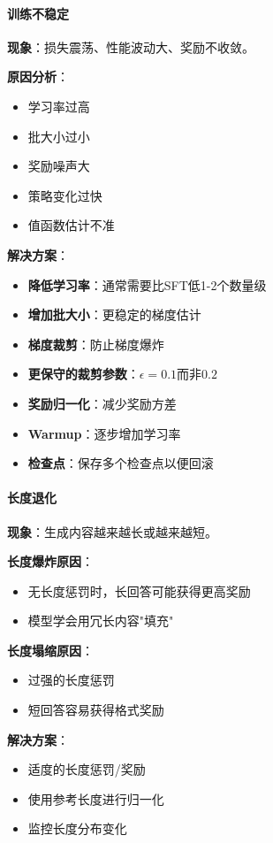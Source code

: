\documentclass[12pt,a4paper]{article}
\begin{document}
\paragraph{训练不稳定}

\textbf{现象}：损失震荡、性能波动大、奖励不收敛。

\textbf{原因分析}：
\begin{itemize}
    \item 学习率过高
    \item 批大小过小
    \item 奖励噪声大
    \item 策略变化过快
    \item 值函数估计不准
\end{itemize}

\textbf{解决方案}：
\begin{itemize}
    \item \textbf{降低学习率}：通常需要比SFT低1-2个数量级
    \item \textbf{增加批大小}：更稳定的梯度估计
    \item \textbf{梯度裁剪}：防止梯度爆炸
    \item \textbf{更保守的裁剪参数}：$\epsilon = 0.1$而非$0.2$
    \item \textbf{奖励归一化}：减少奖励方差
    \item \textbf{Warmup}：逐步增加学习率
    \item \textbf{检查点}：保存多个检查点以便回滚
\end{itemize}

\paragraph{长度退化}

\textbf{现象}：生成内容越来越长或越来越短。

\textbf{长度爆炸原因}：
\begin{itemize}
    \item 无长度惩罚时，长回答可能获得更高奖励
    \item 模型学会用冗长内容"填充"
\end{itemize}

\textbf{长度塌缩原因}：
\begin{itemize}
    \item 过强的长度惩罚
    \item 短回答容易获得格式奖励
\end{itemize}

\textbf{解决方案}：
\begin{itemize}
    \item 适度的长度惩罚/奖励
    \item 使用参考长度进行归一化
    \item 监控长度分布变化
\end{itemize}
\end{document}
